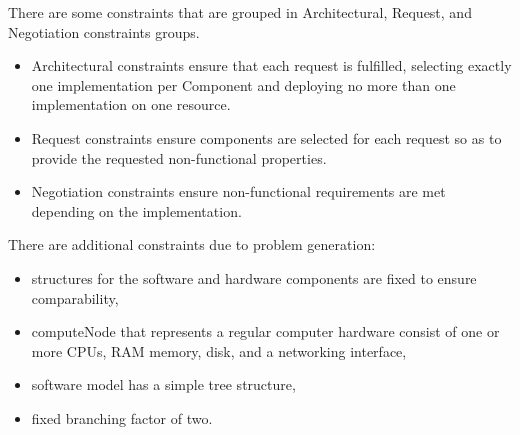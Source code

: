 There are some constraints that are grouped in Architectural, Request, and Negotiation constraints groups.
\begin{itemize}
	\item Architectural constraints ensure that each request is fulfilled, selecting exactly one implementation per Component and deploying no more than one implementation on one resource.
	\item Request constraints ensure components are selected for each request so as to provide the requested non-functional properties.
	\item Negotiation constraints ensure non-functional requirements are met depending on the implementation.
\end{itemize}
There are additional constraints due to problem generation:
\begin{itemize}
	\item structures for the software and hardware components are fixed to ensure comparability,
	\item computeNode that represents a regular computer hardware consist of one or more CPUs, RAM memory, disk, and a networking interface,
	\item software model has a simple tree structure,
	\item fixed branching factor of two.
\end{itemize}


